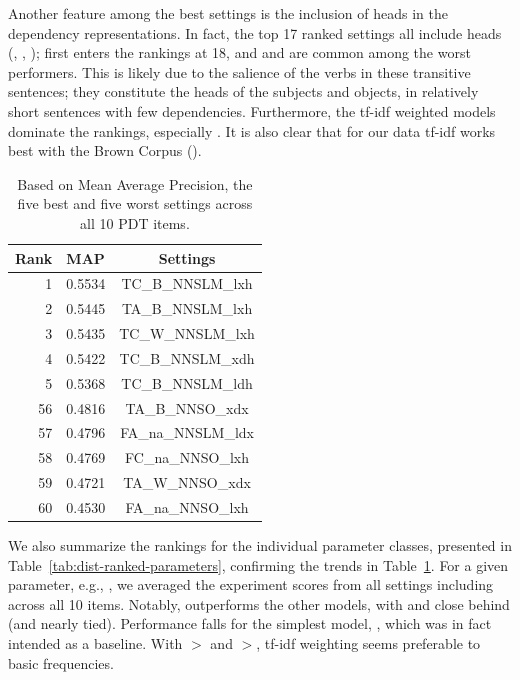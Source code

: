 Another feature among the best settings is the inclusion of heads in the dependency representations. In fact, the top 17 ranked settings all include heads (, , );  first enters the rankings at 18, and  and  are common among the worst performers. This is likely due to the salience of the verbs in these transitive sentences; they constitute the heads of the subjects and objects, in relatively short sentences with few dependencies.
Furthermore, the tf-idf weighted models dominate the rankings, especially . It is also clear that for our data tf-idf works best with the Brown Corpus ().

\begin{table}[htb!]
\begin{center}
\begin{tabular}{|r|l|c|}
\hline
Rank & MAP & Settings \\
\hline
\hline
1 & 0.5534 & TC\_B\_NNSLM\_lxh \\
\hline
2 & 0.5445 & TA\_B\_NNSLM\_lxh \\
\hline
3 & 0.5435 & TC\_W\_NNSLM\_lxh \\
\hline
4 & 0.5422 & TC\_B\_NNSLM\_xdh \\
\hline
5 & 0.5368 & TC\_B\_NNSLM\_ldh \\
\hline
\hline
56 & 0.4816 & TA\_B\_NNSO\_xdx \\
\hline
57 & 0.4796 & FA\_na\_NNSLM\_ldx \\
\hline
58 & 0.4769 & FC\_na\_NNSO\_lxh \\
\hline
59 & 0.4721 & TA\_W\_NNSO\_xdx \\
\hline
60 & 0.4530 & FA\_na\_NNSO\_lxh \\
\hline
\end{tabular}
\caption{Based on Mean Average Precision, the five best and five worst settings across all 10 PDT items.}
\label{tab:all-dist-ranked-settings}
\end{center}
\end{table}

We also summarize the rankings for the individual parameter classes,
presented in Table~\ref{tab:dist-ranked-parameters}, confirming the
trends in Table~\ref{tab:all-dist-ranked-settings}. For a given
parameter, e.g., , we averaged the experiment scores from
all settings including  across all 10 items. Notably,  outperforms the other models, with  and  close behind (and nearly tied). Performance falls for the simplest model, , which was in fact intended as a baseline. With $>$ and $>$, tf-idf weighting seems preferable to basic frequencies.

